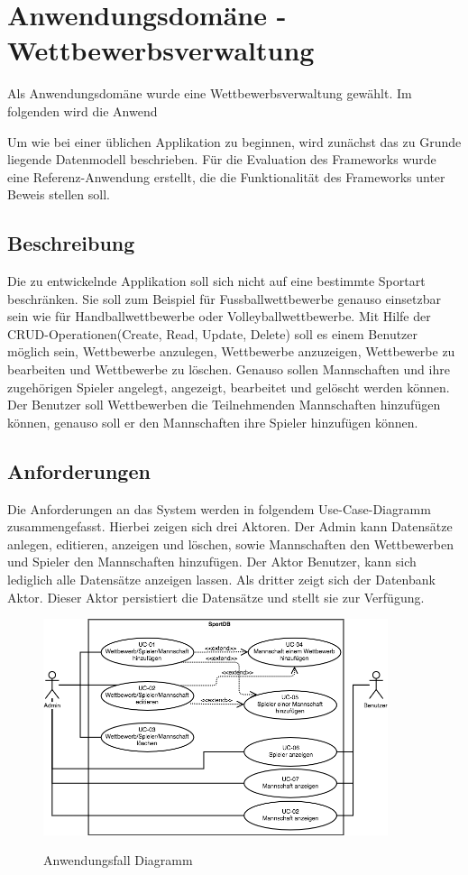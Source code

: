 \chapter{Anwendungsdomäne - Wettbewerbsverwaltung}
Als Anwendungsdomäne wurde eine Wettbewerbsverwaltung gewählt. Im folgenden wird die Anwend


Um wie bei einer üblichen Applikation zu beginnen, wird zunächst das zu Grunde liegende Datenmodell beschrieben.
Für die Evaluation des Frameworks wurde eine Referenz-Anwendung erstellt, die die Funktionalität des Frameworks unter Beweis stellen soll.  
\section{Beschreibung}
Die zu entwickelnde Applikation soll sich nicht auf eine bestimmte Sportart beschränken. Sie soll zum Beispiel für
Fussballwettbewerbe genauso einsetzbar sein wie für Handballwettbewerbe oder Volleyballwettbewerbe. Mit Hilfe der
CRUD-Operationen(Create, Read, Update, Delete) soll es einem Benutzer möglich sein, Wettbewerbe anzulegen,
Wettbewerbe anzuzeigen, Wettbewerbe zu bearbeiten und Wettbewerbe zu löschen. Genauso sollen Mannschaften und ihre
zugehörigen Spieler angelegt, angezeigt, bearbeitet und gelöscht werden können. Der Benutzer soll Wettbewerben die
Teilnehmenden Mannschaften hinzufügen können, genauso soll er den Mannschaften ihre Spieler hinzufügen können.

\section{Anforderungen}
Die Anforderungen an das System werden in folgendem Use-Case-Diagramm zusammengefasst. Hierbei zeigen sich drei
Aktoren. Der Admin kann Datensätze anlegen, editieren, anzeigen und löschen, sowie Mannschaften den
Wettbewerben und Spieler den Mannschaften hinzufügen. Der Aktor Benutzer, kann sich lediglich alle
Datensätze anzeigen lassen. Als dritter zeigt sich der Datenbank Aktor. Dieser Aktor persistiert die Datensätze und
stellt sie zur Verfügung.


\begin{figure}[H]
	\caption{Anwendungsfall Diagramm}
	\includegraphics[width=0.9\textwidth]{content/pictures/use_case}
	\label{pic:usecase_diag}
\end{figure}

